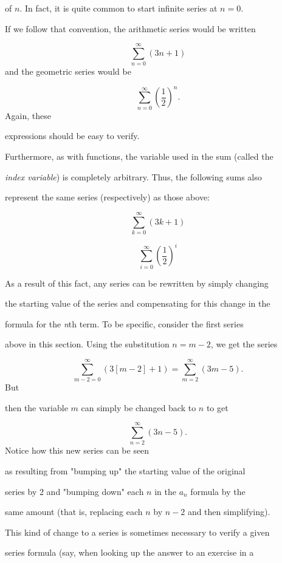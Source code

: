 of $n$. In fact, it is quite common to start infinite series at $n=0$.

If we follow that convention, the arithmetic series would be written



$$\sum _{n=0}^{\infty} (3n+1)$$ and the geometric series would be



$$\sum _{n=0}^{\infty} \left(\frac{1}{2}\right)^n.$$ Again, these

expressions should be easy to verify.



Furthermore, as with functions, the variable used in the sum (called the

\textit{index variable}) is completely arbitrary. Thus, the following sums also

represent the same series (respectively) as those above:



$$\sum _{k=0}^{\infty} (3k+1)$$



$$\sum _{i=0}^{\infty} \left(\frac{1}{2}\right)^i$$



As a result of this fact, any series can be rewritten by simply changing

the starting value of the series and compensating for this change in the

formula for the \textit{n}th term. To be specific, consider the first series

above in this section. Using the substitution $n=m-2$, we get the series



$$\sum _{m-2=0}^{\infty} (3[m-2]+1) = \sum _{m=2}^\infty (3m-5).$$ But

then the variable $m$ can simply be changed back to $n$ to get



$$\sum _{n=2}^{\infty} (3n-5).$$ Notice how this new series can be seen

as resulting from "bumping up" the starting value of the original

series by 2 and "bumping down" each $n$ in the $a _n$ formula by the

same amount (that is, replacing each $n$ by $n-2$ and then simplifying).

This kind of change to a series is sometimes necessary to verify a given

series formula (say, when looking up the answer to an exercise in a

